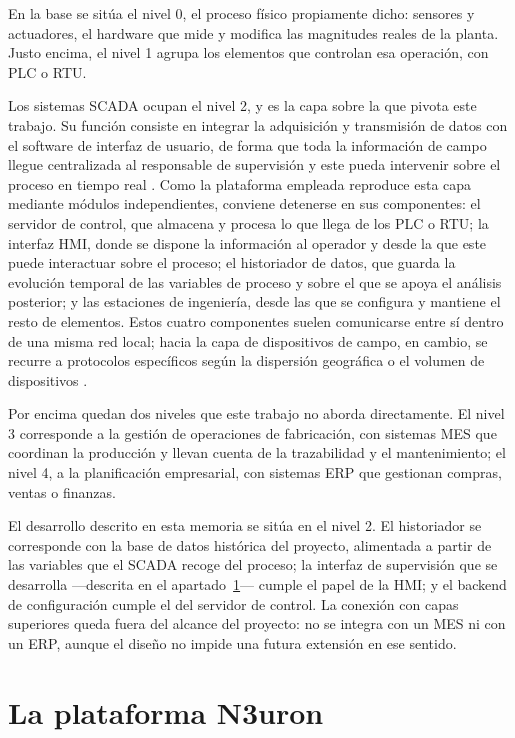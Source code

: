 En la base se sitúa el nivel 0, el proceso físico propiamente dicho:
sensores y actuadores, el hardware que mide y modifica las magnitudes reales
de la planta. Justo encima, el nivel 1 agrupa los elementos que controlan
esa operación, con \gls{PLC} o \gls{RTU}.

Los sistemas SCADA ocupan el nivel 2, y es la capa sobre la que pivota este
trabajo. Su función consiste en integrar la adquisición y transmisión de
datos con el software de interfaz de usuario, de forma que toda la
información de campo llegue centralizada al responsable de supervisión y
este pueda intervenir sobre el proceso en tiempo real \cite{nist-sp800-82}. Como la
plataforma empleada reproduce esta capa mediante módulos independientes,
conviene detenerse en sus componentes: el servidor de control, que almacena
y procesa lo que llega de los PLC o RTU; la interfaz \gls{HMI}, donde se
dispone la información al operador y desde la que este puede interactuar
sobre el proceso; el historiador de datos, que guarda la evolución temporal
de las variables de proceso y sobre el que se apoya el análisis posterior;
y las estaciones de ingeniería, desde las que se configura y mantiene el
resto de elementos. Estos cuatro componentes suelen comunicarse entre sí
dentro de una misma red local; hacia la capa de dispositivos de campo, en
cambio, se recurre a protocolos específicos según la dispersión geográfica
o el volumen de dispositivos \cite{nist-sp800-82}.

Por encima quedan dos niveles que este trabajo no aborda directamente. El
nivel 3 corresponde a la gestión de operaciones de fabricación, con
sistemas \gls{MES} que coordinan la producción y llevan cuenta de la
trazabilidad y el mantenimiento; el nivel 4, a la planificación
empresarial, con sistemas \gls{ERP} que gestionan compras, ventas o
finanzas.

El desarrollo descrito en esta memoria se sitúa en el nivel 2. El
historiador se corresponde con la base de datos histórica del proyecto,
alimentada a partir de las variables que el SCADA recoge del proceso; la
interfaz de supervisión que se desarrolla —descrita en el
apartado~\ref{sec:plataforma-n3uron}— cumple el papel de la HMI; y el
backend de configuración cumple el del servidor de control. La conexión con
capas superiores queda fuera del alcance del proyecto: no se integra con un
MES ni con un ERP, aunque el diseño no impide una futura extensión en ese
sentido.

\section{La plataforma N3uron}
\label{sec:plataforma-n3uron}

